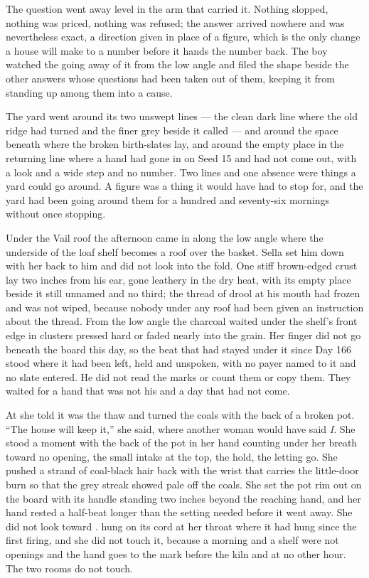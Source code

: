 The question went away level in the arm that carried it. Nothing slopped, nothing was priced, nothing was refused; the answer arrived nowhere and was nevertheless exact, a direction given in place of a figure, which is the only change a house will make to a number before it hands the number back. The boy watched the going away of it from the low angle and filed the shape beside the other answers whose questions had been taken out of them, keeping it from standing up among them into a cause.

The yard went around its two unswept lines --- the clean dark line where the old ridge had turned and the finer grey beside it called  --- and around the space beneath  where the broken birth-slates lay, and around the empty place in the returning line where a hand had gone in on Seed 15 and had not come out, with a look and a wide step and no number. Two lines and one absence were things a yard could go around. A figure was a thing it would have had to stop for, and the yard had been going around them for a hundred and seventy-six mornings without once stopping.

\scenebreak

Under the Vail roof the afternoon came in along the low angle where the underside of the loaf shelf becomes a roof over the basket. Sella set him down with her back to him and did not look into the fold. One stiff brown-edged crust lay two inches from his ear, gone leathery in the dry heat, with its empty place beside it still unnamed and no third; the thread of drool at his mouth had frozen and was not wiped, because nobody under any roof had been given an instruction about the thread. From the low angle the charcoal waited under the shelf's front edge in clusters pressed hard or faded nearly into the grain. Her finger did not go beneath the board this day, so the beat that had stayed under it since Day 166 stood where it had been left, held and unspoken, with no payer named to it and no slate entered. He did not read the marks or count them or copy them. They waited for a hand that was not his and a day that had not come.

At  she told  it was the thaw and turned the coals with the back of a broken pot. “The house will keep it,” she said, where another woman would have said \emph{I}. She stood a moment with the back of the pot in her hand counting under her breath toward no opening, the small intake at the top, the hold, the letting go. She pushed a strand of coal-black hair back with the wrist that carries the little-door burn so that the grey streak showed pale off the coals. She set the pot rim out on the board with its handle standing two inches beyond the reaching hand, and her hand rested a half-beat longer than the setting needed before it went away. She did not look toward .  hung on its cord at her throat where it had hung since the first firing, and she did not touch it, because a morning and a shelf were not openings and the hand goes to the mark before the kiln and at no other hour. The two rooms do not touch.

